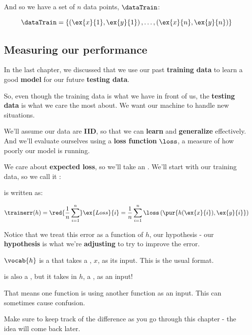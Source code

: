         And so we have a set of $n$ data points, $\dataTrain$:
        
        \begin{equation*}
            \dataTrain = 
            \left\{  
            \left(\ex{x}{1}, \ex{y}{1}\right), \dots,
            \left(\ex{x}{n}, \ex{y}{n}\right)
            \right\}
        \end{equation*}
        
    \subsection{Measuring our performance}
        
        In the last chapter, we discussed that we use our past \textbf{training data} to learn a good \textbf{model} for our future \textbf{testing data}.
        
        So, even though the training data is what we have in front of us, the \textbf{testing data} is what we care the most about. We want our machine to handle new situations.
        
        We'll assume our data are \textbf{IID}, so that we can \textbf{learn} and \textbf{generalize} effectively. And we'll evaluate ourselves using a \textbf{loss function} $\loss$, a measure of how poorly our model is running.
        
        We care about \textbf{expected loss}, so we'll take an . We'll start with our training data, so we call it :\\
        
        \begin{kequation}
        
         is written as:
        
            \begin{equation}
                \trainerr(h) = \red{ \frac{1}{n}  \sum_{i=1}^n } \ex{Loss}{i} = 
                \frac{1}{n}  \sum_{i=1}^n \loss \left( \pur{ h(\ex{x}{i}), \ex{y}{i} } \right)
            \end{equation}
        \end{kequation}
        
        
        Notice that we treat this error as a function of $h$, our hypothesis - our \textbf{hypothesis} is what we're \textbf{adjusting} to try to improve the error.\\
        
        \begin{clarification}
            $\vocab{h}$ is a  that takes a , $x$, as its input. This is the usual format.
            
            \vocab{$\trainerr$} is also a , but it takes in $h$, a , as an input!
            
            That means one function is using another function as an input. This can sometimes cause confusion.
            
            Make sure to keep track of the difference as you go through this chapter - the idea will come back later.
        \end{clarification}
        

